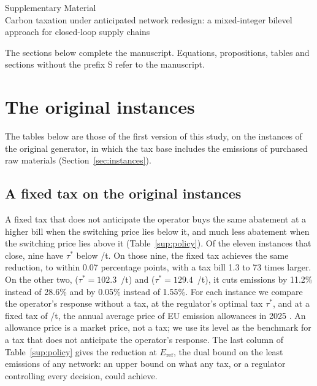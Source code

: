 \documentclass[11pt]{article}
\theoremstyle{remark}
\newcommand{\Eref}{E_{\mathrm{ref}}}
\newcommand{\inst}[1]{\texttt{\detokenize{#1}}}
\newcommand{\EUR}{\texteuro}
\begin{document}
\begin{center}
{\Large Supplementary Material}\\[0.5em]
{\large Carbon taxation under anticipated network redesign: a mixed-integer bilevel approach for closed-loop supply chains}
\end{center}

The sections below complete the manuscript. Equations, propositions, tables and sections without the prefix S refer to the manuscript.

\section{The original instances}\label{sup:original}

The tables below are those of the first version of this study, on the instances of the original generator, in which the tax base includes the emissions of purchased raw materials (Section~\ref{sec:instances}).

\subsection{A fixed tax on the original instances}\label{sup:anticipation}

A fixed tax that does not anticipate the operator buys the same abatement at a higher bill when the switching price lies below it, and much less abatement when the switching price lies above it (Table~\ref{sup:policy}). Of the eleven instances that close, nine have $\tau^*$ below \EUR74/t. On those nine, the fixed tax achieves the same reduction, to within 0.07 percentage points, with a tax bill 1.3 to 73 times larger. On the other two, \inst{STD_I25_M4_T6} ($\tau^* = 102.3$~\EUR/t) and \inst{STD_I33_M8_T6} ($\tau^* = 129.4$~\EUR/t), it cuts emissions by 11.2\% instead of 28.6\% and by 0.05\% instead of 1.55\%. For each instance we compare the operator's response without a tax, at the regulator's optimal tax $\tau^*$, and at a fixed tax of \EUR74/t, the annual average price of EU emission allowances in 2025 \parencite{esma2026carbon}. An allowance price is a market price, not a tax; we use its level as the benchmark for a tax that does not anticipate the operator's response. The last column of Table~\ref{sup:policy} gives the reduction at $\Eref$, the dual bound on the least emissions of any network: an upper bound on what any tax, or a regulator controlling every decision, could achieve.
\end{document}
